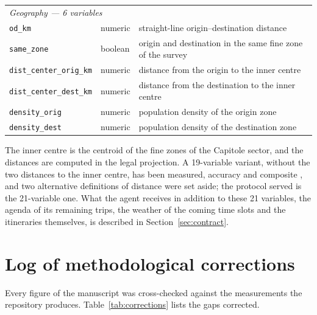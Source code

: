 \begin{table}[tp]
\begin{tabular}{llp{}}
    \midrule
    \multicolumn{3}{l}{\textit{Geography --- 6 variables}} \\
    \texttt{od\_km}                   & numeric     & straight-line origin--destination distance \\
    \texttt{same\_zone}               & boolean     & origin and destination in the same fine zone of the survey \\
    \texttt{dist\_center\_orig\_km}   & numeric     & distance from the origin to the inner centre \\
    \texttt{dist\_center\_dest\_km}   & numeric     & distance from the destination to the inner centre \\
    \texttt{density\_orig}            & numeric     & population density of the origin zone \\
    \texttt{density\_dest}            & numeric     & population density of the destination zone \\
    \bottomrule
  \end{tabular}
\end{table}

The inner centre is the centroid of the fine zones of the Capitole sector, and the distances are computed in the legal projection. A 19-variable variant, without the two distances to the inner centre, has been measured, accuracy  and composite , and two alternative definitions of distance were set aside; the protocol served is the 21-variable one. What the agent receives in addition to these 21 variables, the agenda of its remaining trips, the weather of the coming time slots and the itineraries themselves, is described in Section~\ref{sec:contract}.

\section{Log of methodological corrections}
\label{app:corrections}

Every figure of the manuscript was cross-checked against the measurements the repository produces. Table~\ref{tab:corrections} lists the gaps corrected.

